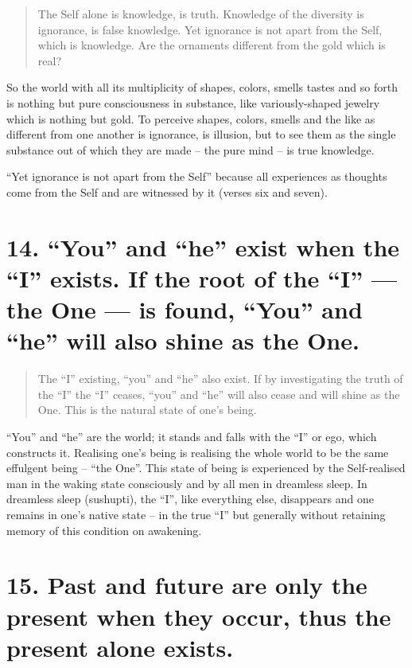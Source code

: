 \documentclass[12pt]{report}
\begin{document}
\begin{quote}
  The Self alone is knowledge, is truth. Knowledge of the diversity is
  ignorance, is false knowledge. Yet ignorance is not apart from the
  Self, which is knowledge. Are the ornaments different from the gold
  which is real?
\end{quote}


So the world with all its multiplicity of shapes, colors, smells
tastes and so forth is nothing but pure consciousness in substance,
like variously-shaped jewelry which is nothing but gold. To perceive
shapes, colors, smells and the like as different from one another is
ignorance, is illusion, but to see them as the single substance out of
which they are made -- the pure mind -- is true knowledge.

``Yet ignorance is not apart from the Self'' because all experiences
as thoughts come from the Self and are witnessed by it (verses six and
seven). 

\section{14. ``You'' and ``he'' exist when the ``I'' exists. If the
  root of the ``I'' --- the One --- is found, ``You'' and ``he'' will
  also shine as the One.}

\begin{quote}
  The ``I'' existing, ``you'' and ``he'' also exist. If by investigating
  the truth of the ``I'' the ``I'' ceases, ``you'' and ``he'' will also
  cease and will shine as the One. This is the natural state of one's
  being.

\end{quote}

``You'' and ``he'' are the world; it stands and falls with the ``I''
or ego, which constructs it. Realising one's being is realising the
whole world to be the same effulgent being -- ``the One''. This state
of being is experienced by the Self-realised man in the waking state
consciously and by all men in dreamless sleep. In dreamless sleep
(sushupti), the ``I'', like everything else, disappears and one
remains in one's native state -- in the true ``I'' but generally
without retaining memory of this condition on awakening.

\section{15. Past and future are only the present when they occur,
  thus the present alone exists.}
\end{document}
